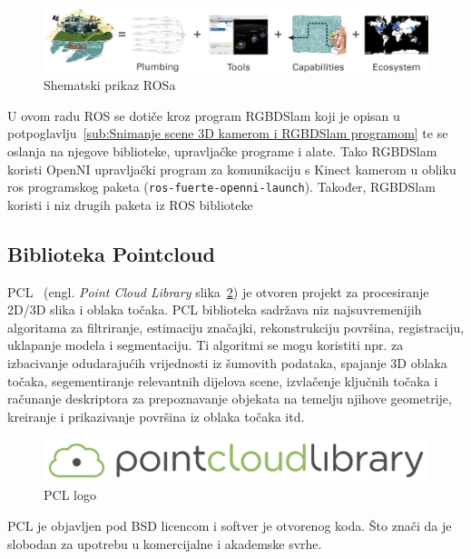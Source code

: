 \begin{figure}[h]
\centering
\includegraphics[scale=0.45]{figures/ros.png}
\caption{Shematski prikaz ROSa}
\label{fig:ros.png}
\end{figure}

U ovom radu ROS se dotiče kroz program RGBDSlam koji je opisan u
potpoglavlju~\ref{sub:Snimanje scene 3D kamerom i RGBDSlam programom} te se oslanja na
njegove biblioteke, upravljačke programe i alate. Tako RGBDSlam koristi
OpenNI upravljački program za komunikaciju s Kinect kamerom u obliku ros
programskog paketa (\texttt{ros-fuerte-openni-launch}). Također, RGBDSlam
koristi i niz drugih paketa iz ROS biblioteke~\cite{web:rgbdslam}


\subsection{Biblioteka Pointcloud} %
\label{sub:Biblioteka Pointcloud}

PCL~\cite{pcl} (engl. \textit{Point Cloud Library}
slika~\ref{fig:pcl.png}) je otvoren projekt za procesiranje 2D/3D slika
i oblaka točaka. PCL biblioteka sadržava niz najsuvremenijih algoritama
za filtriranje, estimaciju značajki, rekonstrukciju površina,
registraciju, uklapanje modela i segmentaciju.  Ti algoritmi se mogu
koristiti npr. za izbacivanje odudarajućih vrijednosti iz šumovith
podataka, spajanje 3D oblaka točaka, segementiranje relevantnih dijelova
scene, izvlačenje ključnih točaka i računanje deskriptora za
prepoznavanje objekata na temelju njihove geometrije, kreiranje i
prikazivanje površina iz oblaka točaka itd.

\begin{figure}[h]
\centering
\includegraphics[scale=0.15]{figures/pcl.png}
\caption{PCL logo}
\label{fig:pcl.png}
\end{figure}

PCL je objavljen pod BSD licencom i softver je otvorenog koda. Što znači
da je slobodan za upotrebu u komercijalne i akademske svrhe.

